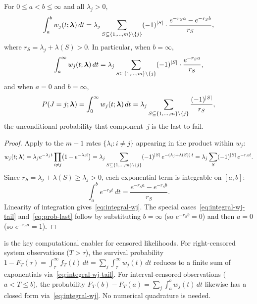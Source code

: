 \begin{lemma}\label{lem:integral-wj}
  For $0 \leq a < b \leq \infty$ and all $\lambda_j > 0$,
  \begin{equation}\label{eq:integral-wj}
    \int_a^b w_j(t; \boldsymbol{\lambda})\, dt
    = \lambda_j \sum_{S \subseteq \{1,\ldots,m\} \setminus \{j\}}
      (-1)^{|S|} \cdot
      \frac{e^{-r_S a} - e^{-r_S b}}{r_S},
  \end{equation}
  where $r_S = \lambda_j + \lambda(S) > 0$.
  In particular, when $b = \infty$,
  \begin{equation}\label{eq:integral-wj-tail}
    \int_a^\infty w_j(t; \boldsymbol{\lambda})\, dt
    = \lambda_j \sum_{S \subseteq \{1,\ldots,m\} \setminus \{j\}}
      (-1)^{|S|} \cdot \frac{e^{-r_S a}}{r_S},
  \end{equation}
  and when $a = 0$ and $b = \infty$,
  \begin{equation}\label{eq:prob-last}
    P(J = j; \boldsymbol{\lambda}) = \int_0^\infty w_j(t; \boldsymbol{\lambda})\, dt
    = \lambda_j \sum_{S \subseteq \{1,\ldots,m\} \setminus \{j\}}
      \frac{(-1)^{|S|}}{r_S},
  \end{equation}
  the unconditional probability that component~$j$ is the last to fail.
\end{lemma}

\begin{proof}
Apply  to the $m-1$ rates $\{\lambda_i : i \neq j\}$
appearing in the product within $w_j$:
\[
  w_j(t; \boldsymbol{\lambda})
  = \lambda_j e^{-\lambda_j t} \prod_{i \neq j}
    \bigl(1 - e^{-\lambda_i t}\bigr)
  = \lambda_j \sum_{S \subseteq \{1,\ldots,m\} \setminus \{j\}}
    (-1)^{|S|}\, e^{-({\lambda_j + \lambda(S)})\, t}
  = \lambda_j \sum_S (-1)^{|S|}\, e^{-r_S t}.
\]
Since $r_S = \lambda_j + \lambda(S) \geq \lambda_j > 0$, each exponential
term is integrable on $[a, b]$:
\[
  \int_a^b e^{-r_S t}\, dt = \frac{e^{-r_S a} - e^{-r_S b}}{r_S}.
\]
Linearity of integration gives~\eqref{eq:integral-wj}.  The special
cases~\eqref{eq:integral-wj-tail} and~\eqref{eq:prob-last} follow by
substituting $b = \infty$ (so $e^{-r_S b} = 0$) and then $a = 0$
(so $e^{-r_S a} = 1$).
\end{proof}

\begin{remark}\label{rmk:integral-tractability}
 is the key computational enabler for censored
likelihoods.  For right-censored system observations ($T > \tau$), the
survival probability $1 - F_T(\tau) = \int_\tau^\infty f_T(t)\, dt =
\sum_j \int_\tau^\infty w_j(t)\, dt$ reduces to a finite sum of
exponentials via~\eqref{eq:integral-wj-tail}.  For interval-censored
observations ($a < T \leq b$), the probability
$F_T(b) - F_T(a) = \sum_j \int_a^b w_j(t)\, dt$ likewise has a closed
form via~\eqref{eq:integral-wj}.  No numerical quadrature is needed.
\end{remark}

